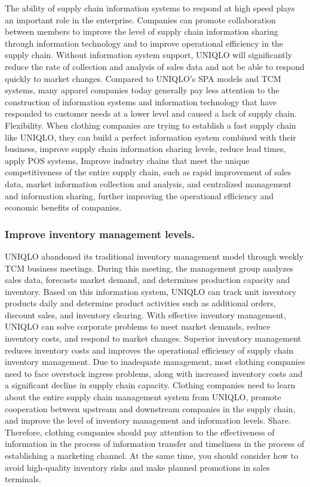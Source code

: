 \documentclass[12pt,]{article}
\begin{document}
The ability of supply chain information systems to respond at high speed
plays an important role in the enterprise. Companies can promote
collaboration between members to improve the level of supply chain
information sharing through information technology and to improve
operational efficiency in the supply chain. Without information system
support, UNIQLO will significantly reduce the rate of collection and
analysis of sales data and not be able to respond quickly to market
changes. Compared to UNIQLO's SPA models and TCM systems, many apparel
companies today generally pay less attention to the construction of
information systems and information technology that have responded to
customer needs at a lower level and caused a lack of supply chain.
Flexibility. When clothing companies are trying to establish a fast
supply chain like UNIQLO, they can build a perfect information system
combined with their business, improve supply chain information sharing
levels, reduce lead times, apply POS systems, Improve industry chains
that meet the unique competitiveness of the entire supply chain, such as
rapid improvement of sales data, market information collection and
analysis, and centralized management and information sharing, further
improving the operational efficiency and economic benefits of companies.

\hypertarget{improve-inventory-management-levels.}{%
\subsubsection{Improve inventory management
levels.}\label{improve-inventory-management-levels.}}

UNIQLO abandoned its traditional inventory management model through
weekly TCM business meetings. During this meeting, the management group
analyzes sales data, forecasts market demand, and determines production
capacity and inventory. Based on this information system, UNIQLO can
track unit inventory products daily and determine product activities
such as additional orders, discount sales, and inventory clearing. With
effective inventory management, UNIQLO can solve corporate problems to
meet market demands, reduce inventory costs, and respond to market
changes. Superior inventory management reduces inventory costs and
improves the operational efficiency of supply chain inventory
management. Due to inadequate management, most clothing companies need
to face overstock ingress problems, along with increased inventory costs
and a significant decline in supply chain capacity. Clothing companies
need to learn about the entire supply chain management system from
UNIQLO, promote cooperation between upstream and downstream companies in
the supply chain, and improve the level of inventory management and
information levels. Share. Therefore, clothing companies should pay
attention to the effectiveness of information in the process of
information transfer and timeliness in the process of establishing a
marketing channel. At the same time, you should consider how to avoid
high-quality inventory risks and make planned promotions in sales
terminals.
\end{document}

